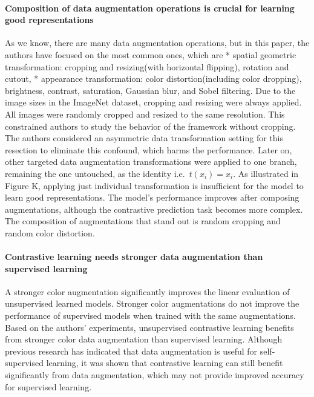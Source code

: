 \documentclass[
]{krantz}
\begin{document}
\hypertarget{composition-of-data-augmentation-operations-is-crucial-for-learning-good-representations}{%
\paragraph{Composition of data augmentation operations is crucial for learning good representations}\label{composition-of-data-augmentation-operations-is-crucial-for-learning-good-representations}}

As we know, there are many data augmentation operations, but in this paper, the authors have focused on the most common ones, which are
* spatial geometric transformation: cropping and resizing(with horizontal flipping), rotation and cutout,
* appearance transformation: color distortion(including color dropping), brightness, contrast, saturation, Gaussian blur, and Sobel filtering.
Due to the image sizes in the ImageNet dataset, cropping and resizing were always applied. All images were randomly cropped and resized to the same resolution. This constrained authors to study the behavior of the framework without cropping. The authors considered an asymmetric data transformation setting for this resection to eliminate this confound, which harms the performance. Later on, other targeted data augmentation transformations were applied to one branch, remaining the one untouched, as the identity i.e.~\(t\left( x_{i}\right)= x_i\).
As illustrated in Figure K, applying just individual transformation is insufficient for the model to learn good representations. The model's performance improves after composing augmentations, although the contrastive prediction task becomes more complex. The composition of augmentations that stand out is random cropping and random color distortion.

\hypertarget{contrastive-learning-needs-stronger-data-augmentation-than-supervised-learning}{%
\paragraph{Contrastive learning needs stronger data augmentation than supervised learning}\label{contrastive-learning-needs-stronger-data-augmentation-than-supervised-learning}}

A stronger color augmentation significantly improves the linear evaluation of unsupervised learned models. Stronger color augmentations do not improve the performance of supervised models when trained with the same augmentations. Based on the authors' experiments, unsupervised contrastive learning benefits from stronger color data augmentation than supervised learning. Although previous research has indicated that data augmentation is useful for self-supervised learning, it was shown that contrastive learning can still benefit significantly from data augmentation, which may not provide improved accuracy for supervised learning.
\end{document}
